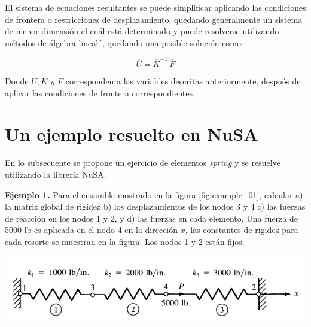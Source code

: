 El sistema de ecuaciones resultantes se puede simplificar aplicando las condiciones 
de frontera o restricciones de desplazamiento, quedando generalmente un sistema 
de menor dimensión el cuál está determinado y puede resolverse utilizando métodos 
de álgebra lineal´, quedando una posible solución como:

\begin{equation}
\overline{U} = \overline{K}^{-1}\, \overline{F}
\end{equation}

Donde $\overline{U}, \overline{K} \,\, y \,\, \overline{F}$ corresponden a las variables descritas 
anteriormente, después de aplicar las condiciones de frontera correspondientes.


\section{Un ejemplo resuelto en NuSA}

En lo subsecuente se propone un ejercicio de elementos \textit{spring} y se resuelve 
utilizando la librería NuSA.

\textbf{Ejemplo 1.} Para el ensamble mostrado en la figura \ref{fig:example_01}, calcular 
a) la matriz global de rigidez  b) los desplazamientos de los nodos 3 y 4  c) las fuerzas 
de reacción en los nodos 1 y 2, y  d) las fuerzas en cada elemento. Una fuerza de 5000 lb 
es aplicada en el nodo 4 en la dirección $x$, las constantes de rigidez para cada resorte 
se muestran en la figura. Los nodos 1 y 2 están fijos.

\begin{center}
\includegraphics[scale=0.8]{src/spring-element/example_01.png}
\label{fig:example_01}
\end{center}

